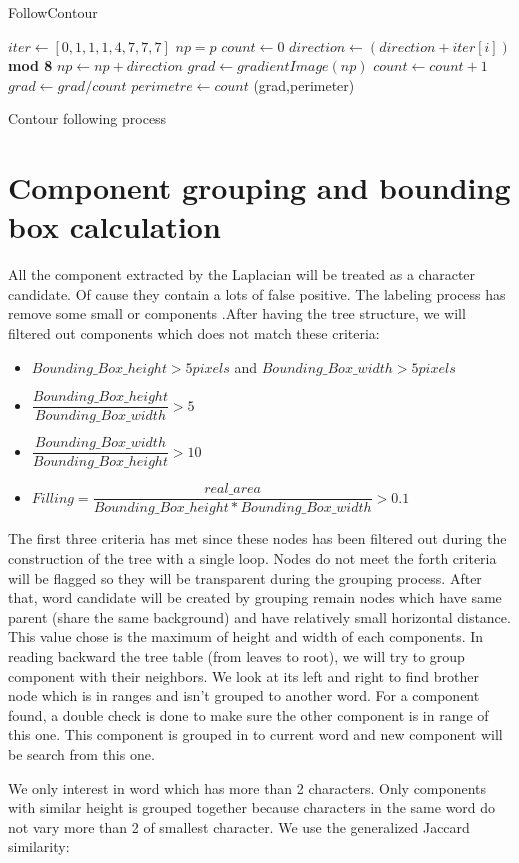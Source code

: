 \begin{algorithm}
\caption{FollowContour}\label{alg:ContourFollowing}
\begin{algorithmic}[1]
\State $iter \gets [0,1,1,1,4,7,7,7]$
\State $np = p$ 
\State $count \gets 0$
\Repeat 
{}
	\State $direction \gets (direction + iter[i])$ \textbf{ mod 8}
		\State $np \gets np+direction$
		\State $grad \gets gradientImage(np)$
		\State $count \gets count+1$
	\EndIf
\EndFor
{}
\State $grad\gets grad/count$
\State $perimetre \gets count $
\State \Return (grad,perimeter)
\EndProcedure
\end{algorithmic}
\caption{Contour following process}
\end{algorithm}

\section{Component grouping and bounding box calculation}
\par
All the component extracted by the Laplacian will be treated as a character candidate. Of cause they contain a lots of false positive. The labeling process has remove some small or  components .After having the tree structure, we will filtered out components which does not match these criteria:
\begin{itemize} 
	\item $Bounding\_Box\_height >5 pixels $ and $Bounding\_Box\_width>5 pixels $
	\item $\dfrac{Bounding\_Box\_height}{Bounding\_Box\_width} >5 $  
	\item $\dfrac{Bounding\_Box\_width}{Bounding\_Box\_height} >10 $	
	\item $Filling =\dfrac{real\_area}{Bounding\_Box\_height*Bounding\_Box\_width} >0.1$
\end{itemize}
\par
The first three criteria has met since these nodes has been filtered out during the construction of the tree with a single loop. Nodes do not meet the forth criteria will be flagged so they will be transparent during the grouping process. After that, word candidate will be created by grouping remain nodes which have same parent (share the same background) and have relatively small horizontal distance. This value chose is the maximum of height and width of each components. In reading backward the tree table (from leaves to root), we will try to group component with their neighbors. We look at its left and right to find brother node which is in ranges and isn't grouped to another word. For a component found, a double check is done to make sure the other component is in range of this one. This component is grouped in to current word and new component will be search from this one. 
\par
We only interest in word which has more than 2 characters. Only components with similar height is grouped together because characters in the same word do not vary more than 2 of smallest character. We use the generalized Jaccard similarity: 


